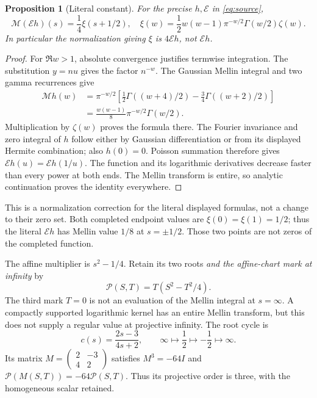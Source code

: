 \documentclass[11pt,reqno]{amsart}
\newtheorem{proposition}[theorem]{Proposition}
\theoremstyle{definition}\newtheorem{definition}[theorem]{Definition}
\theoremstyle{remark}\newtheorem{remark}[theorem]{Remark}
\newcommand{\M}{\mathcal M}\newcommand{\K}{\mathcal K}\newcommand{\E}{\mathcal E}
\begin{document}
\begin{proposition}[Literal constant]\label{prop:normalization}
For the precise $h,\E$ in \eqref{eq:source},
\[
\M(\E h)(s)=\frac14\xi(s+1/2),
\quad
\xi(w)=\frac12w(w-1)\pi^{-w/2}\Gamma(w/2)\zeta(w).
\]
In particular the normalization giving $\xi$ is $4\E h$, not $\E h$.
\end{proposition}
\begin{proof}
For $\Re w>1$, absolute convergence justifies termwise integration. The substitution $y=nu$ gives the factor $n^{-w}$. The Gaussian Mellin integral and two gamma recurrences give
\begin{align*}
\M h(w)&=\pi^{-w/2}\left[\frac12\Gamma((w+4)/2)-\frac34\Gamma((w+2)/2)\right]\\
&=\frac{w(w-1)}8\pi^{-w/2}\Gamma(w/2).
\end{align*}
Multiplication by $\zeta(w)$ proves the formula there. The Fourier invariance and zero integral of $h$ follow either by Gaussian differentiation or from its displayed Hermite combination; also $h(0)=0$. Poisson summation therefore gives $\E h(u)=\E h(1/u)$. The function and its logarithmic derivatives decrease faster than every power at both ends. The Mellin transform is entire, so analytic continuation proves the identity everywhere.
\end{proof}
This is a normalization correction for the literal displayed formulas, not a change to their zero set. Both completed endpoint values are $\xi(0)=\xi(1)=1/2$; thus the literal $\E h$ has Mellin value $1/8$ at $s=\pm1/2$. Those two points are not zeros of the completed function.

The affine multiplier is $s^2-1/4$. Retain its two roots \emph{and the affine-chart mark at infinity} by
\begin{equation}\label{eq:projective}
\mathscr P(S,T)=T(S^2-T^2/4).
\end{equation}
The third mark $T=0$ is not an evaluation of the Mellin integral at $s=\infty$. A compactly supported logarithmic kernel has an entire Mellin transform, but this does not supply a regular value at projective infinity.
The root cycle is
\begin{equation}\label{eq:cycle}
c(s)=\frac{2s-3}{4s+2},\qquad
\infty\mapsto\frac12\mapsto-\frac12\mapsto\infty.
\end{equation}
Its matrix $M=\left(\begin{smallmatrix}2&-3\\4&2\end{smallmatrix}\right)$ satisfies $M^3=-64I$ and
$\mathscr P(M(S,T))=-64\mathscr P(S,T)$. Thus its projective order is three, with the homogeneous scalar retained.
\end{document}
